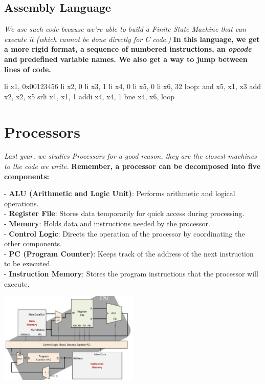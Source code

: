 \subsection{Assembly Language}
\textit{We use such code because we're able to build a Finite State Machine that can execute it (which cannot be done directly for C code.)} \newline
\textbf{In this language, we get a more rigid format, a sequence of numbered instructions, an \textit{opcode} and predefined variable names. We also get a way to jump between lines of code.} \newline   
\newpage
\begin{center}
    \begin{assembly}
    li x1, 0x00123456
    li x2, 0
    li x3, 1
    li x4, 0
    li x5, 0
    li x6, 32
loop: and x5, x1, x3
    add x2, x2, x5
    srli x1, x1, 1
    addi x4, x4, 1
    bne x4, x6, loop
    \end{assembly}
\end{center} 

\section{Processors}
\textit{Last year, we studies Processors for a good reason, they are the closest machines to the code we write.} \newline
\textbf{Remember, a processor can be decomposed into five components:} \newline

- \textbf{ALU (Arithmetic and Logic Unit)}: Performs arithmetic and logical operations. \\
- \textbf{Register File}: Stores data temporarily for quick access during processing. \\
- \textbf{Memory}: Holds data and instructions needed by the processor. \\
- \textbf{Control Logic}: Directs the operation of the processor by coordinating the other components. \\
- \textbf{PC (Program Counter)}: Keeps track of the address of the next instruction to be executed. \\
- \textbf{Instruction Memory}: Stores the program instructions that the processor will execute. \\

\begin{center}
    \includegraphics[width=0.5\textwidth]{chapters/chapter1/images/processor.png}
\end{center}

